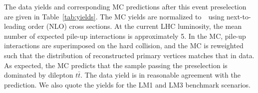 
The data yields and corresponding MC predictions after this event preselection
are given in Table~\ref{tab:yields}. The MC yields are normalized to~\lumifinal\ using 
next-to-leading order (NLO) cross sections. At the current LHC luminosity, the mean
number of expected pile-up interactions is approximately 5. In the MC, pile-up interactions
are superimposed on the hard collision, and the MC is reweighted such that the distribution
of reconstructed primary vertices matches that in data. As expected, the MC predicts that the 
sample passing the preselection is dominated by dilepton $t\bar{t}$. The data yield is in 
reasonable agreement with the prediction. We also quote the yields for
the LM1 and LM3 benchmark scenarios.

